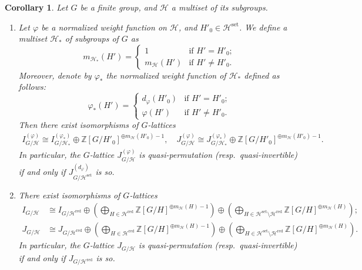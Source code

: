 \documentclass[12pt]{amsart}
\theoremstyle{plain}
\newtheorem{cor}[thm]{Corollary}
\theoremstyle{definition}
\numberwithin{thm}{section}
\numberwithin{equation}{section}
\newcommand{\Z}{\mathbb{Z}}
\newcommand{\cH}{\mathcal{H}}
\DeclareMathOperator{\red}{red}
\DeclareMathOperator{\set}{set}
\begin{document}
\begin{cor}\label{cor:rdrd}
Let $G$ be a finite group, and $\cH$ a multiset of its subgroups. 
\begin{enumerate}

\item Let $\varphi$ be a normalized weight function on $\cH$, and $H'_{0}\in \cH^{\set}$. We define a multiset $\cH_{*}$ of subgroups of $G$ as%
\begin{equation*}
    m_{\cH_{*}}(H')=
    \begin{cases}
        1&\text{if }H'=H'_{0};\\
        m_{\cH}(H')&\text{if }H'\neq H'_{0}. 
    \end{cases}
\end{equation*}
Moreover, denote by $\varphi_{*}$ the normalized weight function of $\cH_{*}$ defined as follows: 
\begin{equation*}
    \varphi_{*}(H')=
    \begin{cases}
        d_{\varphi}(H'_{0})&\text{if }H'=H'_{0};\\
        \varphi(H')&\text{if }H'\neq H'_{0}. 
    \end{cases}
\end{equation*}
Then there exist isomorphisms of $G$-lattices
\begin{align*}
I_{G/\cH}^{(\varphi)} \cong I_{G/\cH_{*}}^{(\varphi_{*})} \oplus \Z[G/H'_{0}]^{\oplus m_{\cH}(H'_{0})-1},\quad
J_{G/\cH}^{(\varphi)} \cong J_{G/\cH_{*}}^{(\varphi_{*})} \oplus \Z[G/H'_{0}]^{\oplus m_{\cH}(H'_{0})-1}. 
\end{align*}
In particular, the $G$-lattice $J_{G/\cH}^{(\varphi)}$ is quasi-permutation (resp.~quasi-invertible) if and only if $J_{G/\cH^{\set}}^{(d_{\varphi})}$ is so. 
\item There exist isomorphisms of $G$-lattices
\begin{align*}
I_{G/\cH} &\cong I_{G/\cH^{\red}} \oplus \left(\bigoplus_{H\in \cH^{\red}}\Z[G/H]^{\oplus m_{\cH}(H)-1}\right)\oplus \left(\bigoplus_{H\in \cH^{\set}\setminus \cH^{\red}}\Z[G/H]^{\oplus m_{\cH}(H)}\right);\\
J_{G/\cH} &\cong J_{G/\cH^{\red}}\oplus \left(\bigoplus_{H\in \cH^{\red}}\Z[G/H]^{\oplus m_{\cH}(H)-1}\right)\oplus \left(\bigoplus_{H\in \cH^{\set}\setminus \cH^{\red}}\Z[G/H]^{\oplus m_{\cH}(H)}\right). 
\end{align*}
In particular, the $G$-lattice $J_{G/\cH}$ is quasi-permutation (resp.~quasi-invertible) if and only if $J_{G/\cH^{\red}}$ is so. 
\end{enumerate}
\end{cor}
\end{document}
